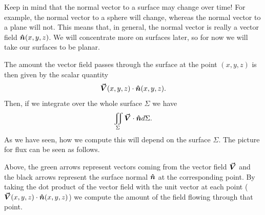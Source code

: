        	\begin{figure}[H]
       		\centering
       		\def\svgwidth{0.75\columnwidth}
       		
       	\end{figure}
       	
       	 Keep in mind that the normal vector to a surface may change over time!  For example, the normal vector to a sphere will change, whereas the normal vector to a plane will not. This means that, in general, the normal vector is really a vector field $\boldsymbol{\hat{n}}(x,y,z)$. We will concentrate more on surfaces later, so for now we will take our surfaces to be planar.
       	
       	The amount the vector field passes through the surface at the point $(x,y,z)$ is then given by the scalar quantity
       	\[
       	\boldsymbol{\vec{V}}(x,y,z) \cdot \boldsymbol{\hat{n}}(x,y,z).  
       	\]
       	Then, if we integrate over the whole surface $\Sigma$ we have
       	\[
       	\iint_\Sigma  \boldsymbol{\vec{V}} \cdot \boldsymbol{\hat{n}} d\Sigma.
       	\]
        As we have seen, how we compute this will depend on the surface $\Sigma$. The picture for flux can be seen as follows.
        
               	\begin{figure}[H]
               		\centering
               		\def\svgwidth{0.75\columnwidth}
               		
               	\end{figure}
               	
         Above, the green arrows represent vectors coming from the vector field $\boldsymbol{\vec{V}}$ and the black arrows represent the surface normal $\boldsymbol{\hat{n}}$ at the corresponding point. By taking the dot product of the vector field with the unit vector at each point ($\boldsymbol{\vec{V}}(x,y,z)\cdot \boldsymbol{\hat{n}}(x,y,z)$) we compute the amount of the field flowing through that point.
        
